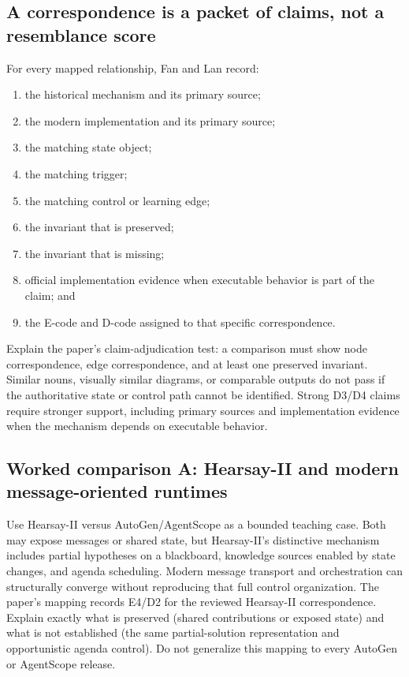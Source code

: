 \subsection{A correspondence is a packet of claims, not a resemblance score}
For every mapped relationship, Fan and Lan record:
\begin{enumerate}
  \item the historical mechanism and its primary source;
  \item the modern implementation and its primary source;
  \item the matching state object;
  \item the matching trigger;
  \item the matching control or learning edge;
  \item the invariant that is preserved;
  \item the invariant that is missing;
  \item official implementation evidence when executable behavior is part of the claim; and
  \item the E-code and D-code assigned to that specific correspondence.
\end{enumerate}

Explain the paper's claim-adjudication test: a comparison must show node correspondence, edge correspondence, and at least one preserved invariant. Similar nouns, visually similar diagrams, or comparable outputs do not pass if the authoritative state or control path cannot be identified. Strong D3/D4 claims require stronger support, including primary sources and implementation evidence when the mechanism depends on executable behavior.

\subsection{Worked comparison A: Hearsay-II and modern message-oriented runtimes}
Use Hearsay-II versus AutoGen/AgentScope as a bounded teaching case. Both may expose messages or shared state, but Hearsay-II's distinctive mechanism includes partial hypotheses on a blackboard, knowledge sources enabled by state changes, and agenda scheduling. Modern message transport and orchestration can structurally converge without reproducing that full control organization. The paper's mapping records E4/D2 for the reviewed Hearsay-II correspondence. Explain exactly what is preserved (shared contributions or exposed state) and what is not established (the same partial-solution representation and opportunistic agenda control). Do not generalize this mapping to every AutoGen or AgentScope release.

